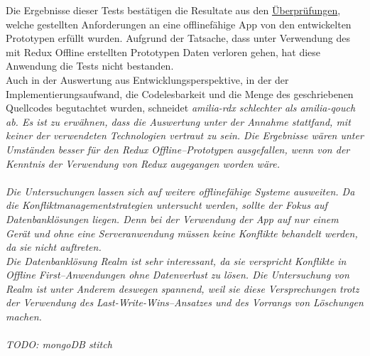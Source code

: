 Die Ergebnisse dieser Tests bestätigen die Resultate aus den \hyperref[chap:auswertunganforderungen]{Überprüfungen}, welche gestellten Anforderungen an eine offlinefähige \gls{App} von den entwickelten Prototypen erfüllt wurden.
Aufgrund der Tatsache, dass unter Verwendung des mit Redux Offline erstellten Prototypen Daten verloren gehen, hat diese Anwendung die Tests nicht bestanden.\\
Auch in der Auswertung aus Entwicklungsperspektive, in der der Implementierungsaufwand, die Codelesbarkeit und die Menge des geschriebenen Quellcodes begutachtet wurden, schneidet \it{amilia-rdx} schlechter als \it{amilia-qouch} ab.
Es ist zu erwähnen, dass die Auswertung unter der Annahme stattfand, mit keiner der verwendeten Technologien vertraut zu sein.
Die Ergebnisse wären unter Umständen besser für den Redux Offline--Prototypen ausgefallen, wenn von der Kenntnis der Verwendung von Redux augegangen worden wäre.\\\\
%
%
%
Die Untersuchungen lassen sich auf weitere offlinefähige Systeme ausweiten.
Da die Konfliktmanagementstrategien untersucht werden, sollte der Fokus auf Datenbanklösungen liegen.
Denn bei der Verwendung der \gls{App} auf nur einem Gerät und ohne eine Serveranwendung müssen keine Konflikte behandelt werden, da sie nicht auftreten.\\
Die Datenbanklösung Realm ist sehr interessant, da sie verspricht Konflikte in Offline First--Anwendungen ohne Datenverlust zu lösen.
Die Untersuchung von Realm ist unter Anderem deswegen spannend, weil sie diese Versprechungen trotz der Verwendung des Last-Write-Wins--Ansatzes und des Vorrangs von Löschungen machen.\\\\
%
%
%

%
%
%
TODO: mongoDB stitch ~\cite{stitch}